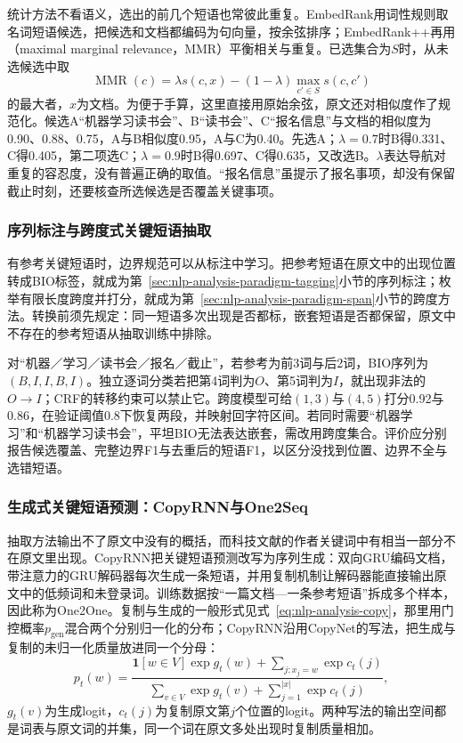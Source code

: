 统计方法不看语义，选出的前几个短语也常彼此重复。EmbedRank用词性规则取名词短语候选，把候选和文档都编码为句向量，按余弦排序；EmbedRank++再用（maximal marginal relevance，MMR）平衡相关与重复。已选集合为$S$时，从未选候选中取
\[
 \operatorname{MMR}(c)=\lambda s(c,x)-(1-\lambda)\max_{c'\in S}s(c,c')
\]
的最大者，$x$为文档。为便于手算，这里直接用原始余弦，原文还对相似度作了规范化。候选A“机器学习读书会”、B“读书会”、C“报名信息”与文档的相似度为0.90、0.88、0.75，A与B相似度0.95，A与C为0.40。先选A；$\lambda=0.7$时B得0.331、C得0.405，第二项选C；$\lambda=0.9$时B得0.697、C得0.635，又改选B。$\lambda$表达导航对重复的容忍度，没有普遍正确的取值。“报名信息”虽提示了报名事项，却没有保留截止时刻，还要核查所选候选是否覆盖关键事项。

\subsubsection{序列标注与跨度式关键短语抽取}
\label{sec:nlp-classification-keyphrase-spans}

有参考关键短语时，边界规范可以从标注中学习。把参考短语在原文中的出现位置转成BIO标签，就成为第~\ref{sec:nlp-analysis-paradigm-tagging}小节的序列标注；枚举有限长度跨度并打分，就成为第~\ref{sec:nlp-analysis-paradigm-span}小节的跨度方法。转换前须先规定：同一短语多次出现是否都标，嵌套短语是否都保留，原文中不存在的参考短语从抽取训练中排除。

对“机器／学习／读书会／报名／截止”，若参考为前3词与后2词，BIO序列为$(B,I,I,B,I)$。独立逐词分类若把第4词判为$O$、第5词判为$I$，就出现非法的$O\to I$；CRF的转移约束可以禁止它。跨度模型可给$(1,3)$与$(4,5)$打分0.92与0.86，在验证阈值0.8下恢复两段，并映射回字符区间。若同时需要“机器学习”和“机器学习读书会”，平坦BIO无法表达嵌套，需改用跨度集合。评价应分别报告候选覆盖、完整边界F1与去重后的短语F1，以区分没找到位置、边界不全与选错短语。

\subsubsection{生成式关键短语预测：CopyRNN与One2Seq}
\label{sec:nlp-classification-copyrnn}

抽取方法输出不了原文中没有的概括，而科技文献的作者关键词中有相当一部分不在原文里出现。CopyRNN把关键短语预测改写为序列生成：双向GRU编码文档，带注意力的GRU解码器每次生成一条短语，并用复制机制让解码器能直接输出原文中的低频词和未登录词。训练数据按“一篇文档—一条参考短语”拆成多个样本，因此称为One2One。复制与生成的一般形式见式~\eqref{eq:nlp-analysis-copy}，那里用门控概率$p_{\mathrm{gen}}$混合两个分别归一化的分布；CopyRNN沿用CopyNet的写法，把生成与复制的未归一化质量放进同一个分母：
\[
 p_t(w)=\frac{\mathbf1[w\in V]\exp g_t(w)+\sum_{j:x_j=w}\exp c_t(j)}
 {\sum_{v\in V}\exp g_t(v)+\sum_{j=1}^{|x|}\exp c_t(j)},
\]
$g_t(v)$为生成logit，$c_t(j)$为复制原文第$j$个位置的logit。两种写法的输出空间都是词表与原文词的并集，同一个词在原文多处出现时复制质量相加。

